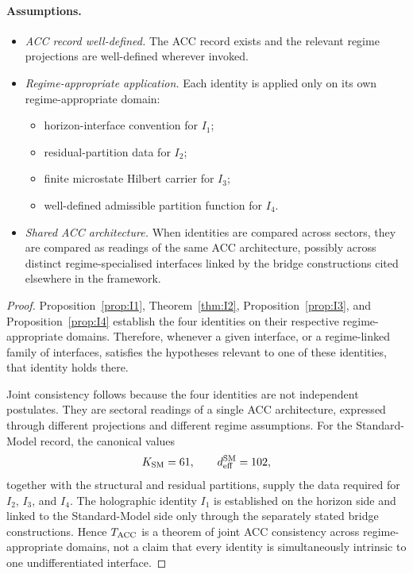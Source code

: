 \documentclass[11pt]{article}
\theoremstyle{plain}
\theoremstyle{definition}
\theoremstyle{remark}
\begin{document}
\paragraph{Assumptions.}
\begin{itemize}[leftmargin=2em,itemsep=2pt]
  \item[\textbf{(U1)}] \emph{ACC record well-defined.} The ACC record exists and the relevant regime projections are well-defined wherever invoked.
  \item[\textbf{(U2)}] \emph{Regime-appropriate application.} Each identity is applied only on its own regime-appropriate domain:
  \begin{itemize}[leftmargin=1.5em,itemsep=1pt]
    \item horizon-interface convention for $I_1$;
    \item residual-partition data for $I_2$;
    \item finite microstate Hilbert carrier for $I_3$;
    \item well-defined admissible partition function for $I_4$.
  \end{itemize}
  \item[\textbf{(U3)}] \emph{Shared ACC architecture.} When identities are compared across sectors, they are compared as readings of the same ACC architecture, possibly across distinct regime-specialised interfaces linked by the bridge constructions cited elsewhere in the framework.
\end{itemize}

\begin{proof}
Proposition~\ref{prop:I1}, Theorem~\ref{thm:I2}, Proposition~\ref{prop:I3}, and Proposition~\ref{prop:I4} establish the four identities on their respective regime-appropriate domains.  Therefore, whenever a given interface, or a regime-linked family of interfaces, satisfies the hypotheses relevant to one of these identities, that identity holds there.

Joint consistency follows because the four identities are not independent postulates.  They are sectoral readings of a single ACC architecture, expressed through different projections and different regime assumptions.  For the Standard-Model record, the canonical values
\[
  K_{\rm SM} = 61,\qquad d_{\rm eff}^{\rm SM} = 102,
\]
together with the structural and residual partitions, supply the data required for $I_2$, $I_3$, and $I_4$.  The holographic identity $I_1$ is established on the horizon side and linked to the Standard-Model side only through the separately stated bridge constructions.  Hence $T_{\rm ACC}$ is a theorem of joint ACC consistency across regime-appropriate domains, not a claim that every identity is simultaneously intrinsic to one undifferentiated interface.
\end{proof}
\end{document}
